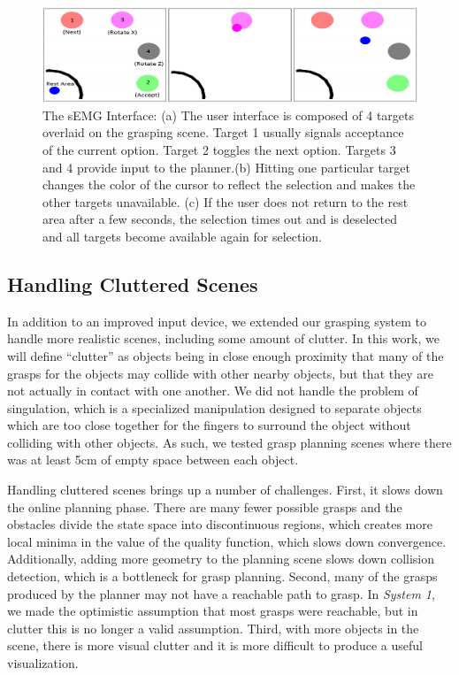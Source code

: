 \begin{figure}
\centering
\includegraphics[width=.99\textwidth]{semg_interface_blank.png}
\caption{The sEMG Interface: (a) The user interface is composed of 4 targets overlaid on the grasping scene. Target 1 usually signals acceptance of the current option. Target 2 toggles the next option. Targets 3 and 4 provide input to the planner.(b) Hitting one particular target changes the color of the cursor to reflect the selection and makes the other targets unavailable. (c) If the user does not return to the rest area after a few seconds, the selection times out and is deselected and all targets become available again for selection. }
\label{fig:semg_ui_blank}
\end{figure}


\subsection{Handling Cluttered Scenes}
In addition to an improved input device, we extended our grasping system to handle more realistic scenes, including some amount of clutter. In this work, we will define ``clutter'' as objects being in close enough proximity that many of the grasps for the objects may collide with other nearby objects, but that they are not actually in contact with one another. We did not handle the problem of singulation, which is a specialized manipulation designed to separate objects which are too close together for the fingers to surround the object without colliding with other objects. As such, we tested grasp planning scenes where there was at least 5cm of empty space between each object. 

Handling cluttered scenes brings up a number of challenges. First, it slows down the online planning phase. There are many fewer possible grasps and the obstacles divide the state space into discontinuous regions, which creates more local minima in the value of the quality function, which slows down convergence. Additionally, adding more geometry to the planning scene slows down collision detection, which is a bottleneck for grasp planning. Second, many of the grasps produced by the planner may not have a reachable path to grasp. In \emph{System 1}, we made the optimistic assumption that most grasps were reachable, but in clutter this is no longer a valid assumption. Third, with more objects in the scene, there is more visual clutter and it is more difficult to produce a useful visualization.

